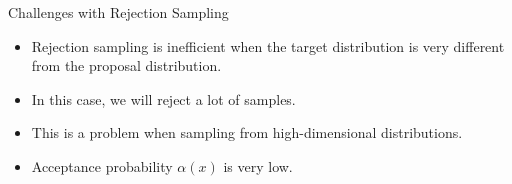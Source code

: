 \documentclass{beamer}
\begin{document}



    \begin{frame}{Challenges with Rejection Sampling}
        \begin{itemize}
            \item Rejection sampling is inefficient when the target distribution is very different from the proposal distribution.
            \item In this case, we will reject a lot of samples.
            \item This is a problem when sampling from high-dimensional distributions.
            \item Acceptance probability $\alpha(x)$ is very low.
        \end{itemize}
    \end{frame}
\end{document}
